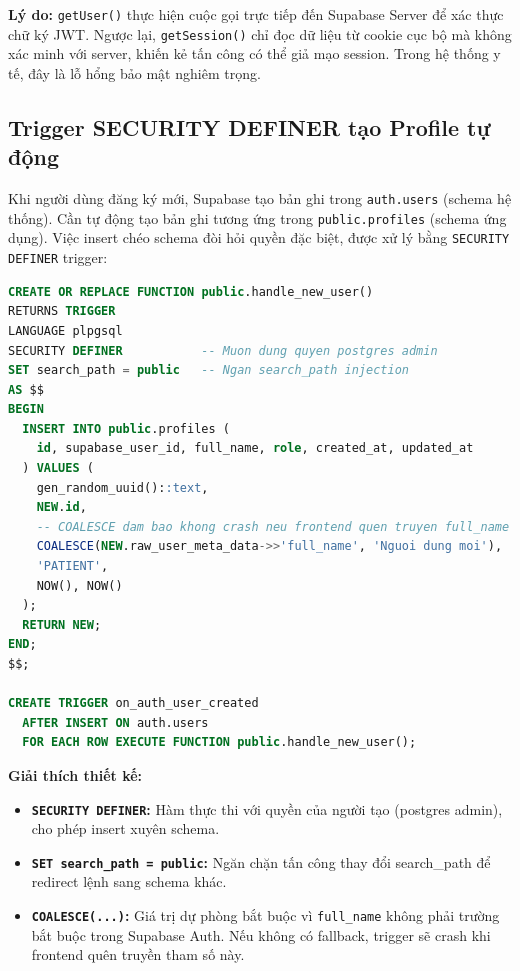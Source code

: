 \documentclass[14pt,a4paper]{report}
\begin{document}
\textbf{Lý do:} \texttt{getUser()} thực hiện cuộc gọi trực tiếp đến
Supabase Server để xác thực chữ ký JWT. Ngược lại, \texttt{getSession()}
chỉ đọc dữ liệu từ cookie cục bộ mà không xác minh với server, khiến
kẻ tấn công có thể giả mạo session. Trong hệ thống y tế, đây là lỗ
hổng bảo mật nghiêm trọng.

\subsection{Trigger SECURITY DEFINER tạo Profile tự động}

Khi người dùng đăng ký mới, Supabase tạo bản ghi trong
\texttt{auth.users} (schema hệ thống). Cần tự động tạo bản ghi
tương ứng trong \texttt{public.profiles} (schema ứng dụng). Việc
insert chéo schema đòi hỏi quyền đặc biệt, được xử lý bằng
\texttt{SECURITY DEFINER} trigger:

\begin{lstlisting}[language=SQL, caption={Trigger tự động tạo Profile khi user đăng ký}]
CREATE OR REPLACE FUNCTION public.handle_new_user()
RETURNS TRIGGER
LANGUAGE plpgsql
SECURITY DEFINER           -- Muon dung quyen postgres admin
SET search_path = public   -- Ngan search_path injection
AS $$
BEGIN
  INSERT INTO public.profiles (
    id, supabase_user_id, full_name, role, created_at, updated_at
  ) VALUES (
    gen_random_uuid()::text,
    NEW.id,
    -- COALESCE dam bao khong crash neu frontend quen truyen full_name
    COALESCE(NEW.raw_user_meta_data->>'full_name', 'Nguoi dung moi'),
    'PATIENT',
    NOW(), NOW()
  );
  RETURN NEW;
END;
$$;

CREATE TRIGGER on_auth_user_created
  AFTER INSERT ON auth.users
  FOR EACH ROW EXECUTE FUNCTION public.handle_new_user();
\end{lstlisting}

\textbf{Giải thích thiết kế:}
\begin{itemize}
    \item \textbf{\texttt{SECURITY DEFINER}:} Hàm thực thi với quyền
          của người tạo (postgres admin), cho phép insert xuyên schema.
    \item \textbf{\texttt{SET search\_path = public}:} Ngăn chặn
          tấn công thay đổi search\_path để redirect lệnh sang schema khác.
    \item \textbf{\texttt{COALESCE(...)}:} Giá trị dự phòng bắt buộc
          vì \texttt{full\_name} không phải trường bắt buộc trong
          Supabase Auth. Nếu không có fallback, trigger sẽ crash khi
          frontend quên truyền tham số này.
\end{itemize}
\end{document}
